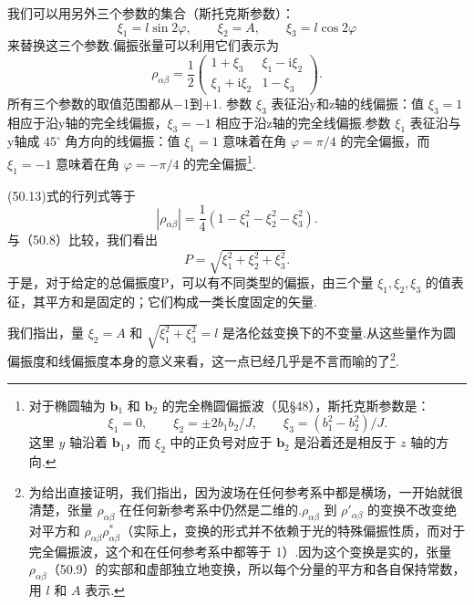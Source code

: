我们可以用另外三个参数的集合（斯托克斯参数）：
\begin{equation}
  \xi_1=l\sin 2\varphi,\qquad
  \xi_2=A,\qquad
  \xi_3=l\cos 2\varphi
\end{equation}
来替换这三个参数.偏振张量可以利用它们表示为
\begin{equation}
  \rho_{\alpha\beta}=\frac{1}{2}
  \begin{pmatrix}
    1+\xi_3 & \xi_1-\mathrm{i}\xi_2\\
    \xi_1+\mathrm{i}\xi_2 & 1-\xi_3
  \end{pmatrix}.
\end{equation}
所有三个参数的取值范围都从−1到+1. 参数 $\xi_3$ 表征沿y和z轴的线偏振：值 $\xi_3 = 1$ 相应于沿y轴的完全线偏振，$\xi_3 = -1$ 相应于沿z轴的完全线偏振.参数 $\xi_1$ 表征沿与y轴成 $45^{\circ}$ 角方向的线偏振：值 $\xi_1 = 1$ 意味着在角 $\varphi = \pi/4$ 的完全偏振，而 $\xi_1 = -1$ 意味着在角 $\varphi = -\pi/4$ 的完全偏振\footnote{对于椭圆轴为 $\boldsymbol{b}_1$ 和 $\boldsymbol{b}_2$ 的完全椭圆偏振波（见§48），斯托克斯参数是：
\begin{equation*}
  \xi_1=0,\qquad \xi_2=\pm 2b_1b_2/J,\qquad \xi_3=(b_1^2-b_2^2)/J.
\end{equation*}
这里 $y$ 轴沿着 $\boldsymbol{b}_1$，而 $\xi_2$ 中的正负号对应于 $\boldsymbol{b}_2$ 是沿着还是相反于 $z$ 轴的方向.}.

(50.13)式的行列式等于
\begin{equation}
  |\rho_{\alpha\beta}|=\frac{1}{4}\left(1-\xi_1^2-\xi_2^2-\xi_3^2\right).
\end{equation}
与（50.8）比较，我们看出
\begin{equation}
  P=\sqrt{\xi_1^2+\xi_2^2+\xi_3^2}.
\end{equation}
于是，对于给定的总偏振度P，可以有不同类型的偏振，由三个量 $\xi_1,\xi_2,\xi_3$ 的值表征，其平方和是固定的；它们构成一类长度固定的矢量.

我们指出，量 $\xi_2 = A$ 和 $\sqrt{\xi_1^2+\xi_3^2} = l$ 是洛伦兹变换下的不变量.从这些量作为圆偏振度和线偏振度本身的意义来看，这一点已经几乎是不言而喻的了\footnote{为给出直接证明，我们指出，因为波场在任何参考系中都是横场，一开始就很清楚，张量 $\rho_{\alpha\beta}$ 在任何新参考系中仍然是二维的.$\rho_{\alpha\beta}$ 到 $\rho'_{\alpha\beta}$ 的变换不改变绝对平方和 $\rho_{\alpha\beta}\rho^*_{\alpha\beta}$（实际上，变换的形式并不依赖于光的特殊偏振性质，而对于完全偏振波，这个和在任何参考系中都等于 1）.因为这个变换是实的，张量 $\rho_{\alpha\beta}$（50.9）的实部和虚部独立地变换，所以每个分量的平方和各自保持常数，用 $l$ 和 $A$ 表示.}.

